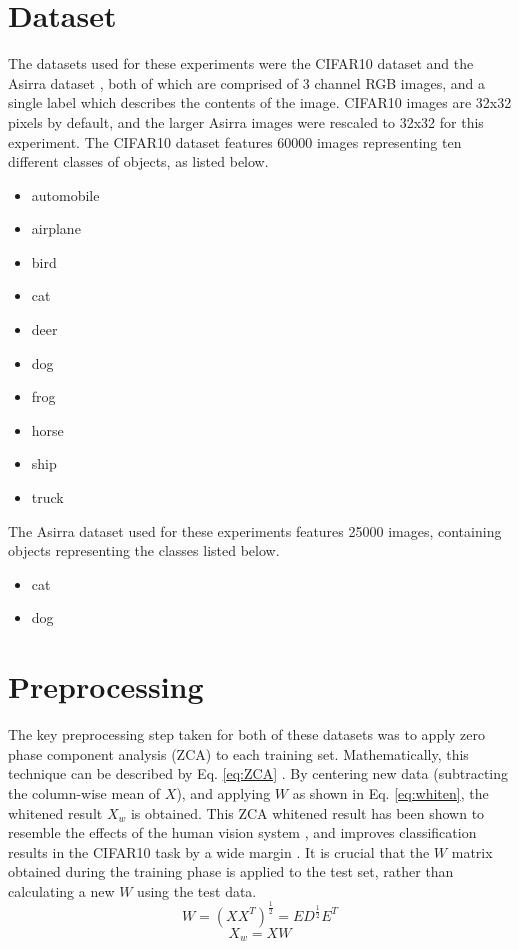 \documentclass[journal]{IEEEtran}
\begin{document}
\section{Dataset}
The datasets used for these experiments were the CIFAR10 dataset \cite{CIFAR10}
and the Asirra dataset \cite{Asirra}, both of which are comprised of 3 channel
RGB  images, and a single label which describes the contents of the image.
CIFAR10 images are 32x32 pixels by default, and the larger Asirra images were 
rescaled to 32x32 for this experiment. The CIFAR10 dataset features 60000 
images representing ten different classes of objects, as listed below.
\begin{itemize}
\item automobile
\item airplane
\item bird 
\item cat
\item deer
\item dog
\item frog
\item horse
\item ship
\item truck
\end{itemize}
The Asirra dataset used for these experiments features 25000 images, containing
objects representing the classes listed below.
\begin{itemize}
\item cat
\item dog
\end{itemize}

\section{Preprocessing}
The key preprocessing step taken for both of these datasets was to apply zero
phase component analysis (ZCA) to each training set. Mathematically, this 
technique can be described by Eq. \ref{eq:ZCA} \cite{CIFAR10}. By centering 
new data (subtracting the column-wise mean of $X$), and applying $W$ as shown in 
Eq. \ref{eq:whiten}, the whitened result $X_w$ is obtained. This ZCA 
whitened result has been shown to resemble the effects of the human vision
system \cite{ZCA}, and improves classification results in the CIFAR10 task 
by a wide margin \cite{CIFAR10}. It is crucial that the $W$ matrix obtained 
during the training phase is applied to the test set, rather than calculating
a new $W$ using the test data.
\begin{equation}
W = (XX^T)^{\frac{1}{2}} = ED^{\frac{1}{2}}E^T
\label{eq:ZCA}
\end{equation}
\begin{equation}
X_w = XW
\label{eq:whiten}
\end{equation}
\end{document}
